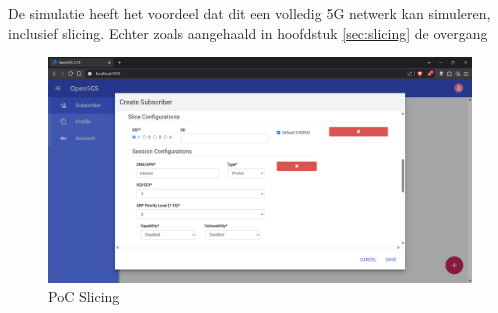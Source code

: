 \subsection{}%
\label{sec:Test-NIC}%



\subsection{}%
\label{sec:Test-ping}%

\subsection{}%
\label{sec:Test-curl}%

\subsection{}%
\label{sec:Test-capture}%

\section{}%
\label{sec:addFeature}%

De simulatie heeft het voordeel dat dit een volledig 5G netwerk kan simuleren, inclusief slicing. Echter zoals aangehaald in hoofdstuk \ref{sec:slicing} de overgang 


\begin{figure}[H]
    \includegraphics[width=\linewidth]{../graphics/POC-Slicing.png}
    \caption{PoC Slicing}
    \label{fig:pocSlicing}
\end{figure}

\section{}%
\label{sec:integrations}%

